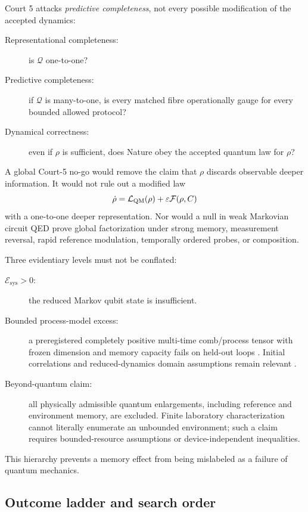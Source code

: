 \documentclass[10pt]{article}
\theoremstyle{definition}
\theoremstyle{remark}
\newcommand{\cQ}{\mathcal Q}
\newcommand{\cE}{\mathcal E}
\begin{document}
Court 5 attacks \emph{predictive completeness}, not every possible modification of the accepted dynamics:
\begin{description}
\item[Representational completeness:] is \(\cQ\) one-to-one?
\item[Predictive completeness:] if \(\cQ\) is many-to-one, is every matched fibre operationally gauge for every bounded allowed protocol?
\item[Dynamical correctness:] even if \(\rho\) is sufficient, does Nature obey the accepted quantum law for \(\rho\)?
\end{description}
A global Court-5 no-go would remove the claim that \(\rho\) discards observable deeper information. It would not rule out a modified law
\[
\dot\rho=\mathcal L_{\rm QM}(\rho)
+\varepsilon\mathcal F(\rho,C)
\]
with a one-to-one deeper representation. Nor would a null in weak Markovian circuit QED prove global factorization under strong memory, measurement reversal, rapid reference modulation, temporally ordered probes, or composition.

Three evidentiary levels must not be conflated:
\begin{description}
\item[\(\cE_{\mathrm{sys}}>0\):] the reduced Markov qubit state is insufficient.
\item[Bounded process-model excess:] a preregistered completely positive multi-time comb/process tensor with frozen dimension and memory capacity fails on held-out loops \citep{ChiribellaCombs2008,Pollock2018PRA,Pollock2018PRL,Taranto2019,White2022}. Initial correlations and reduced-dynamics domain assumptions remain relevant \citep{Pechukas1994}.
\item[Beyond-quantum claim:] all physically admissible quantum enlargements, including reference and environment memory, are excluded. Finite laboratory characterization cannot literally enumerate an unbounded environment; such a claim requires bounded-resource assumptions or device-independent inequalities.
\end{description}
This hierarchy prevents a memory effect from being mislabeled as a failure of quantum mechanics.

\subsection{Outcome ladder and search order}
\end{document}
